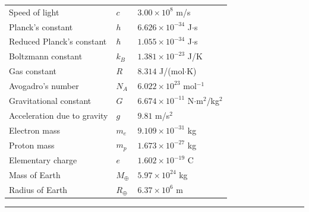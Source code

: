 \begin{center}
\begin{tabular}{lll}
Speed of light & $c$ & $3.00 \times 10^{8}$ m/s \\
Planck's constant & $h$ & $6.626 \times 10^{-34}$ J$\cdot$s \\
Reduced Planck's constant & $\hbar$ & $1.055 \times 10^{-34}$ J$\cdot$s \\
Boltzmann constant & $k_B$ & $1.381 \times 10^{-23}$ J/K \\
Gas constant & $R$ & $8.314$ J/(mol$\cdot$K) \\
Avogadro's number & $N_A$ & $6.022 \times 10^{23}$ mol$^{-1}$ \\
Gravitational constant & $G$ & $6.674 \times 10^{-11}$ N$\cdot$m$^2$/kg$^2$ \\
Acceleration due to gravity & $g$ & $9.81$ m/s$^2$ \\
Electron mass & $m_e$ & $9.109 \times 10^{-31}$ kg \\
Proton mass & $m_p$ & $1.673 \times 10^{-27}$ kg \\
Elementary charge & $e$ & $1.602 \times 10^{-19}$ C \\
Mass of Earth & $M_\oplus$ & $5.97 \times 10^{24}$ kg \\
Radius of Earth & $R_\oplus$ & $6.37 \times 10^{6}$ m \\
\end{tabular}
\end{center}

\noindent\rule{\textwidth}{0.4pt}

